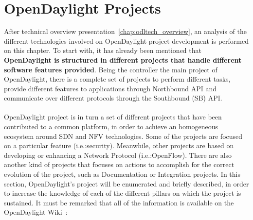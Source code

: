 \documentclass[a4paper, 12pt]{book}
\begin{document}
\section{OpenDaylight Projects}
\label{chap:odltech_projects}
After technical overview presentation~\ref{chap:odltech_overview}, an analysis of the different technologies involved on OpenDaylight project development is performed on this chapter. To start with, it has already been mentioned that \textbf{OpenDaylight is structured in different projects that handle different software features provided}. Being the controller the main project of OpenDaylight, there is a complete set of projects to perform different tasks, provide different features to applications through Northbound API and communicate over different protocols through the Southbound (SB) API.\\
\\
OpenDaylight project is in turn a set of different projects that have been contributed to a common platform, in order to achieve an homogeneous ecosystem around SDN and NFV technologies. Some of the projects are focused on a particular feature (i.e.:security). Meanwhile, other projects are based on developing or enhancing a Network Protocol (i.e.:OpenFlow). There are also another kind of projects that focuses on actions to accomplish for the correct evolution of the project, such as Documentation or Integration projects. In this section, OpenDaylight's project will be enumerated and briefly described, in order to increase the knowledge of each of the different pillars on which the project is sustained. It must be remarked that all of the information is available on the OpenDaylight Wiki~\cite{OpenDaylightWiki}:
\end{document}
